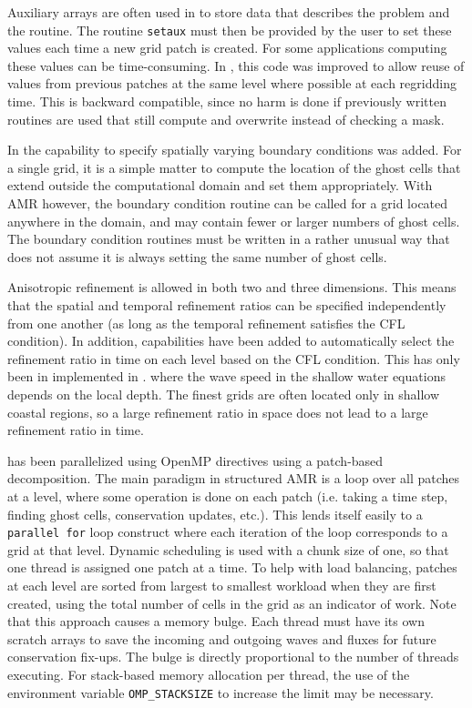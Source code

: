 Auxiliary arrays are often used in \clawpack to store data that
describes the problem and the routine.
The routine \texttt{setaux} must then be provided by the user to set these values each time a
new grid patch is created.  For some applications computing these values can be time-consuming.  In ,
this code was improved to allow reuse of values from previous patches at
the same level where possible at each regridding time.
This is backward compatible, since no harm is done if previously
written routines are used that still compute and overwrite instead of
checking a mask.

In  the capability to specify spatially varying boundary
conditions was added. For a single grid, it is a simple matter to
compute the location of the ghost cells that extend outside the
computational domain and set them appropriately.  With AMR however,
the boundary condition routine can be called for a grid located
anywhere in the domain, and may contain fewer or larger numbers of
ghost cells. The boundary condition routines must be written in a
rather unusual way that does not assume it is always setting the same
number of ghost cells.

Anisotropic refinement is allowed in both two and three dimensions.
This means that the spatial and temporal refinement ratios can be
specified independently from one another (as long as the temporal
refinement satisfies the CFL condition).  In addition, capabilities
have been added to automatically select the refinement ratio in time  on each
level based on the CFL condition.  This has only been in implemented in
\geoclaw. where the wave speed in the shallow water equations
depends on the local depth. The finest grids are often located only in
shallow coastal regions, so a large refinement ratio in space does not
lead to a large refinement ratio in time.

\amrclaw has been
parallelized using OpenMP directives using a  patch-based decomposition.
The main paradigm in structured AMR is a loop over all patches at a level, where
some operation is done on each patch (i.e. taking a time step, finding ghost
cells, conservation updates, etc.).  This lends itself easily to a {\tt parallel
for} loop construct where each iteration of the loop corresponds to a grid at
that level. Dynamic scheduling is used with a chunk size of one, so that one
thread is assigned one patch at a time. To help with load balancing, patches at
each level are sorted from largest to smallest workload when they are first
created, using the total number of cells in the grid as an indicator of work.
Note that this approach causes a memory bulge. Each thread must have its own
scratch arrays to save the incoming and outgoing waves and fluxes for future
conservation fix-ups. The bulge is directly proportional to the number of
threads executing. For stack-based memory allocation per thread, the use of the
environment variable {\tt OMP\_STACKSIZE} to increase the limit may be
necessary.  

